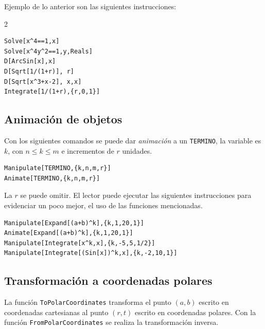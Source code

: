     Ejemplo de lo anterior son las siguientes instrucciones:
    \begin{tcolorbox}
      \begin{multicols}{2}
\begin{Verbatim}[formatcom=\letraverbatim]
Solve[x^4==1,x]
Solve[x^4y^2==1,y,Reals]
D[ArcSin[x],x]
D[Sqrt[1/(1+r)], r]
D[Sqrt[x^3+x-2], x,x]
Integrate[1/(1+r),{r,0,1}]
\end{Verbatim}
      \end{multicols}
    \end{tcolorbox}

    \subsection{Animación de objetos}
    Con los siguientes comandos se puede dar \emph{animación} a un \verb"TERMINO", la variable es $k$, con $n \leq k \leq m $
    e incrementos de $r$ unidades.
    \begin{tcolorbox}[title=Las funciones {\tt Manipulate} y {\tt Animate} ]

\begin{Verbatim}
Manipulate[TERMINO,{k,n,m,r}]
Animate[TERMINO,{k,n,m,r}]
\end{Verbatim}

    \end{tcolorbox}
    La $r$ se puede omitir. %
    El lector puede ejecutar las siguientes instrucciones
    para evidenciar un poco mejor, el uso de las funciones mencionadas.
    \begin{tcolorbox}[title=Ejemplos con {\tt Manipulate} y {\tt Animate}]
\begin{Verbatim}
Manipulate[Expand[(a+b)^k],{k,1,20,1}]
Animate[Expand[(a+b)^k],{k,1,20,1}]
Manipulate[Integrate[x^k,x],{k,-5,5,1/2}]
Manipulate[Integrate[(Sin[x])^k,x],{k,-2,10,1}]
\end{Verbatim}
    \end{tcolorbox}

    \subsection{Transformación a coordenadas polares}
    La función \verb"ToPolarCoordinates" transforma el punto $(a,b)$ escrito en coordenadas cartesianas
    al punto $(r, t)$ escrito en coordenadas polares.
    Con la función \verb"FromPolarCoordinates" se realiza la transformación inversa.
      

